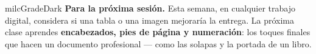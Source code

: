 \documentclass[11pt,letterpaper]{article}
\begin{document}
\begin{infoband}{milcGradeDark}
\textbf{Para la próxima sesión.} Esta semana, en cualquier trabajo digital, considera si una tabla o una imagen mejoraría la entrega. La próxima clase aprendes \textbf{encabezados, pies de página y numeración}: los toques finales que hacen un documento profesional --- como las solapas y la portada de un libro.
\end{infoband}
\end{document}

